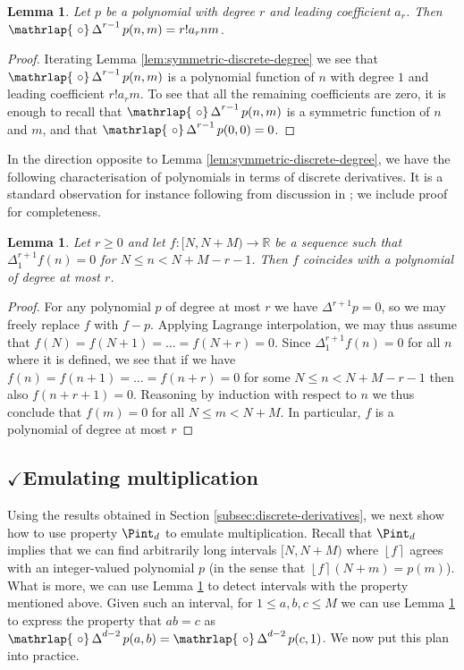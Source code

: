 \documentclass{amsart}
\newtheorem{lemma}[theorem]{Lemma}
\theoremstyle{definition}
\newcommand{\nint}[1]{\left\lfloor #1 \right\rceil}
\newcommand{\RR}{\mathbb{R}}
\newcommand{\DeltaS}{\operatorname{\mathrlap{\ \circ}\operatorname{\Delta}}}
\begin{document}
\begin{lemma}\label{lem:symmetric-discrete-degree^d}
Let $p$ be a polynomial with degree $r$ and leading coefficient $a_r$. Then $\DeltaS^{r-1} p(n,m) = r! a_r nm$.
\end{lemma}
\begin{proof}
Iterating  Lemma \ref{lem:symmetric-discrete-degree}  we see that $\DeltaS^{r-1} p(n,m)$ is a polynomial function of $n$ with degree $1$ and leading coefficient $r! a_r m$. To see that all the remaining coefficients are zero, it is enough to recall that $\DeltaS^{r-1} p(n,m)$ is a symmetric function of $n$ and $m$, and that $\DeltaS^{r-1} p(0,0) = 0$.
\end{proof}

In the direction opposite to Lemma \ref{lem:symmetric-discrete-degree}, we have the following characterisation of polynomials in terms of discrete derivatives. It is a standard observation for instance following from discussion in \cite[Section 2.6]{GKP-1990}; we include proof for completeness.

\begin{lemma}\label{lem:symmetric-discrete-char-poly}	
	Let $r \geq 0$ and let $f \colon [N,N+M) \to \RR$ be a sequence such that $\Delta^{r+1}_1 f(n) = 0$ for $N \leq n < N+ M-r-1$. Then $f$ coincides with a polynomial of degree at most $r$.
\end{lemma}
\begin{proof}
	For any polynomial $p$ of degree at most $r$ we have $\Delta^{r+1} p = 0$, so we may freely replace $f$ with $f-p$. Applying Lagrange interpolation, we may thus assume that $f(N) = f(N+1) = \dots = f(N+r) = 0$. Since $\Delta^{r+1}_1 f(n) = 0$ for all $n$ where it is defined, we see that if we have $f(n) = f(n+1) = \dots = f(n+r) = 0$ for some $N \leq n < N+M-r-1$ then also $f(n+r+1) = 0$. Reasoning by induction with respect to $n$ we thus conclude that $f(m) = 0$ for all $N \leq m < N+M$. In particular, $f$ is a polynomial of degree at most $r$
\end{proof}









\subsection{$\checkmark$Emulating multiplication}
Using the results obtained in Section \ref{subsec:discrete-derivatives}, we next show how to use property $\Pint_d$ to emulate multiplication. Recall that $\Pint_d$ implies that we can find arbitrarily long intervals $[N,N+M)$ where $\nint{f}$ agrees with an integer-valued polynomial $p$ (in the sense that $\nint{f}(N+m) = p(m)$). What is more, we can use Lemma \ref{lem:symmetric-discrete-char-poly} to detect intervals with the property mentioned above. Given such an interval, for $1 \leq a,b,c \leq M$ we can use Lemma \ref{lem:symmetric-discrete-degree^d} to express the property that $ab=c$ as $\DeltaS^{d-2} p(a,b) = \DeltaS^{d-2} p(c,1)$. We now put this plan into practice.
\end{document}
